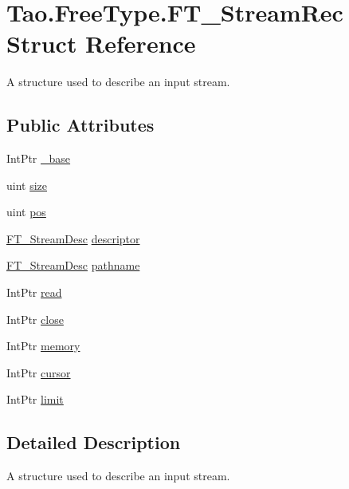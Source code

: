 \hypertarget{struct_tao_1_1_free_type_1_1_f_t___stream_rec}{
\section{Tao.FreeType.FT\_\-StreamRec Struct Reference}
\label{struct_tao_1_1_free_type_1_1_f_t___stream_rec}
}


A structure used to describe an input stream.  


\subsection*{Public Attributes}
\begin{DoxyCompactItemize}
\item 
IntPtr \hyperlink{struct_tao_1_1_free_type_1_1_f_t___stream_rec_a9c94eb02ce40c8ad7eb4fec5440db75e}{\_\-base}
\item 
uint \hyperlink{struct_tao_1_1_free_type_1_1_f_t___stream_rec_a0cb212bb23ff4617114648719787b455}{size}
\item 
uint \hyperlink{struct_tao_1_1_free_type_1_1_f_t___stream_rec_abd434b471c8d33f99416d52484ae756a}{pos}
\item 
\hyperlink{struct_tao_1_1_free_type_1_1_f_t___stream_desc}{FT\_\-StreamDesc} \hyperlink{struct_tao_1_1_free_type_1_1_f_t___stream_rec_a8bc533db9dbe6cd75bf3c16b993a2fb1}{descriptor}
\item 
\hyperlink{struct_tao_1_1_free_type_1_1_f_t___stream_desc}{FT\_\-StreamDesc} \hyperlink{struct_tao_1_1_free_type_1_1_f_t___stream_rec_adc3a39587770a24de4c9316e5fb1b120}{pathname}
\item 
IntPtr \hyperlink{struct_tao_1_1_free_type_1_1_f_t___stream_rec_aeafd0be72e4838c3ce09daa79821cdae}{read}
\item 
IntPtr \hyperlink{struct_tao_1_1_free_type_1_1_f_t___stream_rec_a8b149475fd4162e7635b7bd89b0973b3}{close}
\item 
IntPtr \hyperlink{struct_tao_1_1_free_type_1_1_f_t___stream_rec_a6f0230923b14b522d0f058036a33cf6d}{memory}
\item 
IntPtr \hyperlink{struct_tao_1_1_free_type_1_1_f_t___stream_rec_aca792fb2a3d4a567f7bb4073e55da31d}{cursor}
\item 
IntPtr \hyperlink{struct_tao_1_1_free_type_1_1_f_t___stream_rec_aa6484d95a0c8e8bbfc342ca7f3d6664e}{limit}
\end{DoxyCompactItemize}


\subsection{Detailed Description}
A structure used to describe an input stream. 

